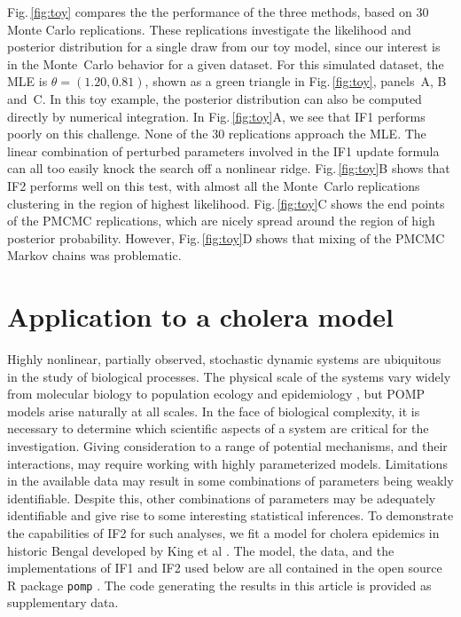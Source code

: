 \documentclass{pnastwo}\usepackage[]{graphicx}\usepackage[]{color}
\newcommand\myFigure{{Fig.$\,$}}
\begin{document}
\begin{article}
{\myFigure}\ref{fig:toy} compares the  the performance of the three methods, based on 30 Monte Carlo replications. 
These replications investigate the likelihood and posterior distribution for a single draw from our toy model, since our interest is in the Monte~Carlo behavior for a given dataset.
For this simulated dataset, the MLE is $\theta=(1.20,0.81)$, shown as a green triangle in {\myFigure}\ref{fig:toy}, panels~A, B and~C. 
In this toy example, the posterior distribution can also be computed directly by numerical integration.
In {\myFigure}\ref{fig:toy}A, we see that IF1 performs poorly on this challenge. 
None of the 30 replications approach the MLE. 
The linear combination of perturbed parameters involved in the IF1 update formula can all too easily knock the search off a nonlinear ridge. 
{\myFigure}\ref{fig:toy}B shows that IF2 performs well on this test, with almost all the Monte~Carlo replications clustering in the region of highest likelihood.
{\myFigure}\ref{fig:toy}C shows the end points of the PMCMC replications, which are nicely spread around the region of high posterior probability. 
However, {\myFigure}\ref{fig:toy}D shows that mixing of the PMCMC Markov chains was problematic.



\section{Application to a cholera model}\label{sec:cholera}
Highly nonlinear, partially observed, stochastic dynamic systems are ubiquitous in the study of biological processes.
The physical scale of the systems vary widely from molecular biology \cite{wilkinson12} to population ecology and epidemiology \cite{keeling09}, but POMP models arise naturally at all scales.
In the face of biological complexity, it is necessary to determine which scientific aspects of a system are critical for the investigation.
Giving consideration to a range of potential mechanisms, and their interactions, may require working with highly parameterized models.
Limitations in the available data may result in some combinations of parameters being weakly identifiable.
Despite this, other combinations of parameters may be adequately identifiable and give rise to some interesting statistical inferences.
To demonstrate the capabilities of IF2 for such analyses, we fit a model for cholera epidemics in historic Bengal developed by King et al \cite{king08}.
The model, the data, and the implementations of IF1 and IF2 used below are all contained in the open source R package {\texttt{pomp}} \cite{pomp}.
The code generating the results in this article is provided as supplementary data.


\end{article}
\end{document}

